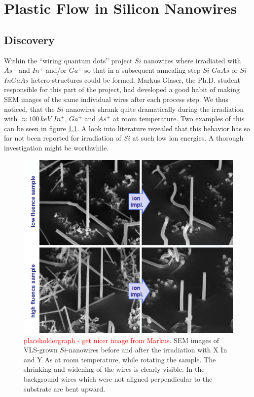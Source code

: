 \chapter{Plastic Flow in Silicon Nanowires}

\section{Discovery}

Within the ``wiring quantum dots'' project $Si$ nanowires where irradiated with $As^+$ and $In^+$ and/or $Ga^+$ so that in a subsequent annealing step $Si$-$GaAs$ or $Si$-$InGaAs$ hetero-structures could be formed. Markus Glaser, the Ph.D. student responsible for this part of the project, had developed a good habit of making SEM images of the same individual wires after each process step. We thus noticed, that the $Si$ nanowires shrank quite dramatically during the irradiation with $\approx 100\,keV$ $In^+$, $Ga^+$ and $As^+$ at room temperature. Two examples of this can be seen in figure \ref{deformSEM}. A look into literature revealed that this behavior has so far not been reported for irradiation of $Si$ at such low ion energies. A thorough investigation might be worthwhile. 
 
\begin{figure}
	\centering
		\includegraphics[width=.48\textwidth]{images/deformSEM.png}
	\caption{\textcolor{red}{placeholdergraph - get nicer image from Markus.} SEM images of VLS-grown $Si$-nanowires before and after the irradiation with X In and Y As at room temperature, while rotating the sample. The shrinking and widening of the wires is clearly visible. In the background wires which were not aligned perpendicular to the substrate are bent upward.} 
	\label{deformSEM}
\end{figure}

